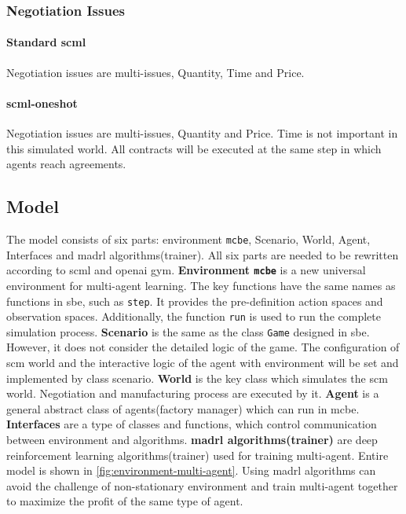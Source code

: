 \subsubsection{Negotiation Issues}
\paragraph{Standard \gls{scml}} Negotiation issues are multi-issues, Quantity, Time and Price. 
\paragraph{\gls{scml-oneshot}} Negotiation issues are multi-issues, Quantity and Price. Time is not important in this simulated world. All contracts will be executed at the same step in which agents reach agreements.

\subsection{Model}
The model consists of six parts: environment \texttt{\gls{mcbe}}, Scenario, World, Agent, Interfaces and \gls{madrl} algorithms(trainer).
All six parts are needed to be rewritten according to \gls{scml} and \gls{openai gym}. 
\textbf{Environment \texttt{\gls{mcbe}}} is a new universal environment for multi-agent learning. The key functions have the same names as functions in \gls{sbe}, such as \texttt{step}. It provides the pre-definition action spaces and observation spaces.  Additionally, the function \texttt{run} is used to run the complete simulation process. 
\textbf{Scenario} is the same as the class \texttt{Game} designed in \gls{sbe}. However, it does not consider the detailed logic of the game. The configuration of \gls{scm} world and the interactive logic of the agent with environment will be set and implemented by class scenario.
\textbf{World} is the key class which simulates the \gls{scm} world. Negotiation and manufacturing process are executed by it.
\textbf{Agent} is a general abstract class of agents(factory manager) which can run in \gls{mcbe}. 
\textbf{Interfaces} are a type of classes and functions, which control communication between environment and algorithms.
\textbf{\gls{madrl} algorithms(trainer)} are deep reinforcement learning algorithms(trainer) used for training multi-agent.
Entire model is shown in \ref{fig:environment-multi-agent}. Using \gls{madrl} algorithms can avoid the challenge of non-stationary environment and train multi-agent together to maximize the profit of the same type of agent.

